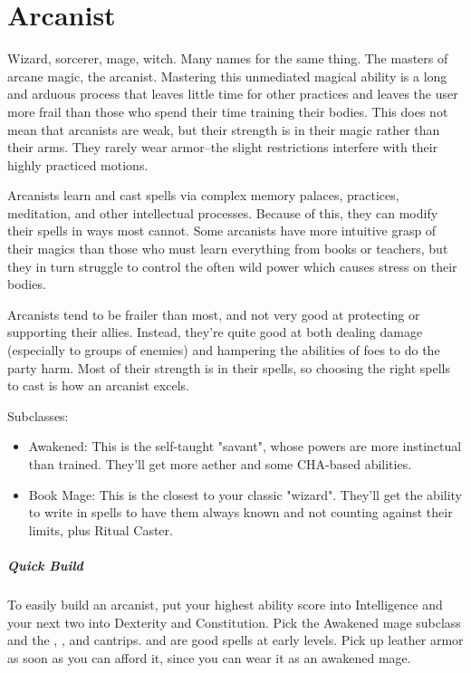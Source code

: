 \section{Arcanist\label{class:arcanist}}

Wizard, sorcerer, mage, witch. Many names for the same thing. The masters of arcane magic, the arcanist. Mastering this unmediated magical ability is a long and arduous process that leaves little time for other practices and leaves the user more frail than those who spend their time training their bodies. This does not mean that arcanists are weak, but their strength is in their magic rather than their arms. They rarely wear armor--the slight restrictions interfere with their highly practiced motions.

Arcanists learn and cast spells via complex memory palaces, practices, meditation, and other intellectual processes. Because of this, they can modify their spells in ways most cannot. Some arcanists have more intuitive grasp of their magics than those who must learn everything from books or teachers, but they in turn struggle to control the often wild power which causes stress on their bodies.

Arcanists tend to be frailer than most, and not very good at protecting or supporting their allies. Instead, they're quite good at both dealing damage (especially to groups of enemies) and hampering the abilities of foes to do the party harm. Most of their strength is in their spells, so choosing the right spells to cast is how an arcanist excels.

Subclasses:
\begin{itemize}
	\item Awakened: This is the self-taught "savant", whose powers are more instinctual than trained. They'll get more aether and some CHA-based abilities.
	\item Book Mage: This is the closest to your classic "wizard". They'll get the ability to write in spells to have them always known and not counting against their limits, plus Ritual Caster.
\end{itemize}

\subparagraph*{Quick Build}
To easily build an arcanist, put your highest ability score into Intelligence and your next two into Dexterity and Constitution. Pick the Awakened mage subclass and the , ,  and  cantrips.  and  are good spells at early levels. Pick up leather armor as soon as you can afford it, since you can wear it as an awakened mage.

